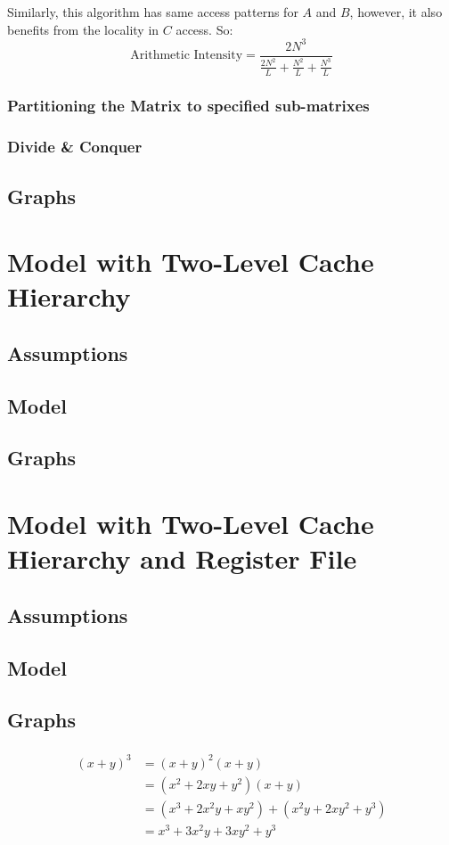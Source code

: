 \documentclass[paper=a4, fontsize=11pt]{scrartcl} %
\numberwithin{equation}{section} %
\numberwithin{figure}{section} %
\numberwithin{table}{section} %
\begin{document}
Similarly, this algorithm has same access patterns for $A$ and $B$, however, it also benefits from the locality in $C$ access. So:
\begin{equation*}
\text{Arithmetic Intensity} = \frac{2N^{3}}{ \frac{2N^{2}}{L} + \frac{N^{2}}{L} + \frac{N^{3}}{L} }
\end{equation*}

\subsubsection{Partitioning the Matrix to specified sub-matrixes}
\subsubsection{Divide \& Conquer}

\subsection{Graphs}
\section{Model with Two-Level Cache Hierarchy}
\subsection{Assumptions}
\subsection{Model}
\subsection{Graphs}
\section{Model with Two-Level Cache Hierarchy and Register File}
\subsection{Assumptions}
\subsection{Model}
\subsection{Graphs}

\begin{align} 
\begin{split}
(x+y)^3 	&= (x+y)^2(x+y)\\
&=(x^2+2xy+y^2)(x+y)\\
&=(x^3+2x^2y+xy^2) + (x^2y+2xy^2+y^3)\\
&=x^3+3x^2y+3xy^2+y^3
\end{split}					
\end{align}
\end{document}
